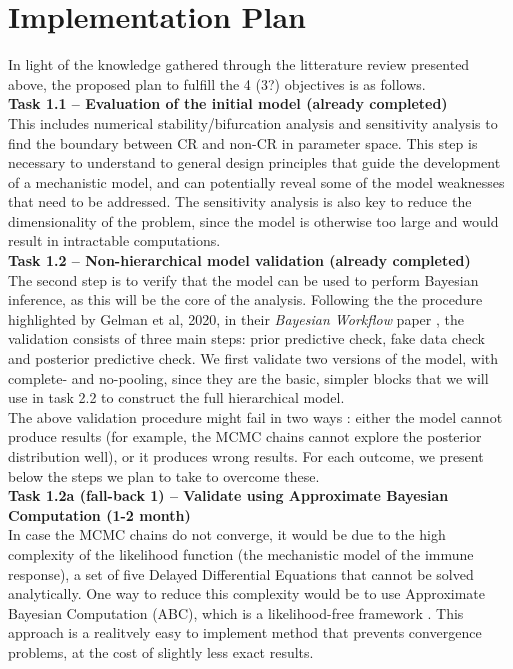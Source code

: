 \documentclass[11pt]{article}
\begin{document}
\section{Implementation Plan}\label{sec:plan}
In light of the knowledge gathered through the litterature review presented above, the proposed plan to fulfill the 4 (3?) objectives is as follows.\\[12pt]
%
\noindent\textbf{Task 1.1 -- Evaluation of the initial model (already completed)}\\
This includes numerical stability/bifurcation analysis and sensitivity analysis to find the boundary between CR and non-CR in parameter space. This step is necessary to understand to general design principles that guide the development of a mechanistic model, and can potentially reveal some of the model weaknesses that need to be addressed. The sensitivity analysis is also key to reduce the dimensionality of the problem, since the model is otherwise too large and would result in intractable computations.\\[12pt]
%
\noindent\textbf{Task 1.2 -- Non-hierarchical model validation (already completed)}\\ 
The second step is to verify that the model can be used to perform Bayesian inference, as this will be the core of the analysis. Following the the procedure highlighted by Gelman et al, 2020, in their \textit{Bayesian Workflow} paper \cite{gelman2020bayesian}, the validation consists of three main steps: prior predictive check, fake data check and posterior predictive check. We first validate two versions of the model, with complete- and no-pooling, since they are the basic, simpler blocks that we will use in task 2.2 to construct the full hierarchical model.\\[12pt]
%
The above validation procedure might fail in two ways : either the model cannot produce results (for example, the MCMC chains cannot explore the posterior distribution well), or it produces wrong results. For each outcome, we present below the steps we plan to take to overcome these.\\[12pt]
%
\noindent\textbf{Task 1.2a (fall-back 1) -- Validate using Approximate Bayesian Computation (1-2 month)}\\ 
In case the MCMC chains do not converge, it would be due to the high complexity of the likelihood function (the mechanistic model of the immune response), a set of five Delayed Differential Equations that cannot be solved analytically. One way to reduce this complexity would be to use Approximate Bayesian Computation (ABC), which is a likelihood-free framework \cite{ABCtuber}. This approach is a  realitvely easy to implement method that prevents convergence problems, at the cost of slightly less exact results. \\[12pt]
\end{document}
